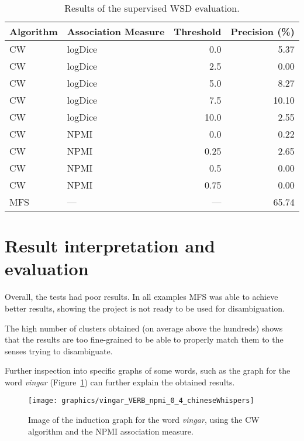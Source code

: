 \begin{table}[ht]
\caption{Results of the supervised \ac*{WSD} evaluation.}
\label{tab:sup-results}
\begin{tabu} to \textwidth {Xlrr}
\hline
\textbf{Algorithm} & \textbf{Association Measure} & \textbf{Threshold} & \textbf{Precision (\%)} \\
\hline
\ac{CW} & logDice   &  0.0 &  5.37 \\
\ac{CW} & logDice   &  2.5 &  0.00 \\
\ac{CW} & logDice   &  5.0 &  8.27 \\
\ac{CW} & logDice   &  7.5 & 10.10 \\
\ac{CW} & logDice   & 10.0 &  2.55 \\
\hline
\ac{CW} & \ac{NPMI} & 0.0  &  0.22 \\
\ac{CW} & \ac{NPMI} & 0.25 &  2.65 \\
\ac{CW} & \ac{NPMI} & 0.5  &  0.00 \\
\ac{CW} & \ac{NPMI} & 0.75 &  0.00 \\
\hline
\ac{MFS} & ---      &  --- & 65.74 \\
\hline
\end{tabu}
\end{table}

\section{Result interpretation and evaluation}

Overall, the tests had poor results. In all examples \ac{MFS} was able to
achieve better results, showing the project is not ready to be used for
disambiguation.

The high number of clusters obtained (on average above the hundreds) shows that
the results are too fine-grained to be able to properly match them to the senses
trying to disambiguate.

Further inspection into specific graphs of some words, such as the graph for the
word \emph{vingar} (Figure~\ref{fig:vingar_graph}) can further explain the
obtained results.

\begin{figure}[ht]
  \caption{Image of the induction graph for the word \emph{vingar}, using the
    \ac*{CW} algorithm and the \ac*{NPMI} association measure.}
  \label{fig:vingar_graph}
  \centering
  \texttt{[image: graphics/vingar\_VERB\_npmi\_0\_4\_chineseWhispers]}
\end{figure}

